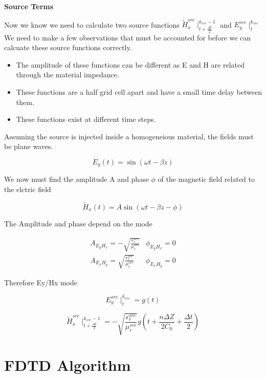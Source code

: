 \documentclass[a4paper,10pt]{article}
\begin{document}
\textbf{Source Terms}

Now we know we need to calculate two source functions $\tilde{H}_{x}^{src}\mid^{k_{src}-1}_{t+\frac{\Delta t}{2}}$ and $E_{y}^{src}\mid_{t}^{k_{src}}$  We need to make a few observations that must be accounted for before we can calcuate these source functions correctly.

\begin{itemize}
 \item The amplitude of these functions can be different as E and H are related through the material impedance.
 \item These functions are a half grid cell apart and have a small time delay between them.
 \item These functions exist at different time steps.
\end{itemize}

Assuming the source is injected inside a homogeneious material, the fields must be plane waves.

\begin{equation}
 E_y(t)=\sin(\omega t - \beta z)
\end{equation}

We now must find the amplitude A and phase $\phi$ of the magnetic field related to the elctric field

\begin{equation}
 \tilde{H}_x(t) = A\sin(\omega t - \beta z - \phi)
\end{equation}

The Amplitude and phase depend on the mode


\begin{eqnarray}
 A_{E_yH_x} = -\sqrt{\frac{\epsilon_r^{src}}{\mu_r^{src}}} & \phi_{E_yH_x} = 0\\
 A_{E_xH_y} = \sqrt{\frac{\epsilon_r^{src}}{\mu_r^{src}}} & \phi_{E_xH_y} = 0
\end{eqnarray}

Therefore Ey/Hx mode

\begin{equation}
 E_y^{src}\mid^{k_{src}}_{t} = g(t)
\end{equation}

\begin{equation}
 \tilde{H}_x^{src}\mid_{t + \frac{\Delta t}{2}}^{k_{src}-1}  = -\sqrt{\frac{\epsilon_r^{src}}{\mu_r^{src}}}g\left(t+\frac{n\Delta Z}{2C_0} + \frac{\Delta t}{2}\right)
\end{equation}


\section{FDTD Algorithm}
\end{document}
